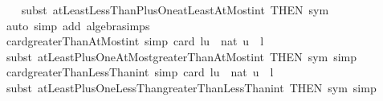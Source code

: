 \begin{isabellebody}
%
\isadelimproof
\ \ %
\endisadelimproof
%
\isatagproof
{}\isamarkupfalse%
\ {\isacharparenleft}{\kern0pt}subst\ atLeastLessThanPlusOne{\isacharunderscore}{\kern0pt}atLeastAtMost{\isacharunderscore}{\kern0pt}int\ {\isacharbrackleft}{\kern0pt}THEN\ sym{\isacharbrackright}{\kern0pt}{\isacharparenright}{\kern0pt}\isanewline
\ \ \isamarkupfalse%
\ {\isacharparenleft}{\kern0pt}auto\ simp\ add{\isacharcolon}{\kern0pt}\ algebra{\isacharunderscore}{\kern0pt}simps{\isacharparenright}{\kern0pt}\isanewline
\ \ \isamarkupfalse%
%
\endisatagproof
{\isafoldproof}%
%
\isadelimproof
\isanewline
%
\endisadelimproof
\isanewline
{}\isamarkupfalse%
\ card{\isacharunderscore}{\kern0pt}greaterThanAtMost{\isacharunderscore}{\kern0pt}int\ {\isacharbrackleft}{\kern0pt}simp{\isacharbrackright}{\kern0pt}{\isacharcolon}{\kern0pt}\ {\isachardoublequoteopen}card\ {\isacharbraceleft}{\kern0pt}l{\isacharless}{\kern0pt}{\isachardot}{\kern0pt}{\isachardot}{\kern0pt}u{\isacharbraceright}{\kern0pt}\ {\isacharequal}{\kern0pt}\ nat\ {\isacharparenleft}{\kern0pt}u\ {\isacharminus}{\kern0pt}\ l{\isacharparenright}{\kern0pt}{\isachardoublequoteclose}\isanewline
%
\isadelimproof
\ \ %
\endisadelimproof
%
\isatagproof
{}\isamarkupfalse%
\ {\isacharparenleft}{\kern0pt}subst\ atLeastPlusOneAtMost{\isacharunderscore}{\kern0pt}greaterThanAtMost{\isacharunderscore}{\kern0pt}int\ {\isacharbrackleft}{\kern0pt}THEN\ sym{\isacharbrackright}{\kern0pt}{\isacharcomma}{\kern0pt}\ simp{\isacharparenright}{\kern0pt}%
\endisatagproof
{\isafoldproof}%
%
\isadelimproof
\isanewline
%
\endisadelimproof
\isanewline
{}\isamarkupfalse%
\ card{\isacharunderscore}{\kern0pt}greaterThanLessThan{\isacharunderscore}{\kern0pt}int\ {\isacharbrackleft}{\kern0pt}simp{\isacharbrackright}{\kern0pt}{\isacharcolon}{\kern0pt}\ {\isachardoublequoteopen}card\ {\isacharbraceleft}{\kern0pt}l{\isacharless}{\kern0pt}{\isachardot}{\kern0pt}{\isachardot}{\kern0pt}{\isacharless}{\kern0pt}u{\isacharbraceright}{\kern0pt}\ {\isacharequal}{\kern0pt}\ nat\ {\isacharparenleft}{\kern0pt}u\ {\isacharminus}{\kern0pt}\ {\isacharparenleft}{\kern0pt}l\ {\isacharplus}{\kern0pt}\ {}{\isacharparenright}{\kern0pt}{\isacharparenright}{\kern0pt}{\isachardoublequoteclose}\isanewline
%
\isadelimproof
\ \ %
\endisadelimproof
%
\isatagproof
{}\isamarkupfalse%
\ {\isacharparenleft}{\kern0pt}subst\ atLeastPlusOneLessThan{\isacharunderscore}{\kern0pt}greaterThanLessThan{\isacharunderscore}{\kern0pt}int\ {\isacharbrackleft}{\kern0pt}THEN\ sym{\isacharbrackright}{\kern0pt}{\isacharcomma}{\kern0pt}\ simp{\isacharparenright}{\kern0pt}%

\end{isabellebody}
